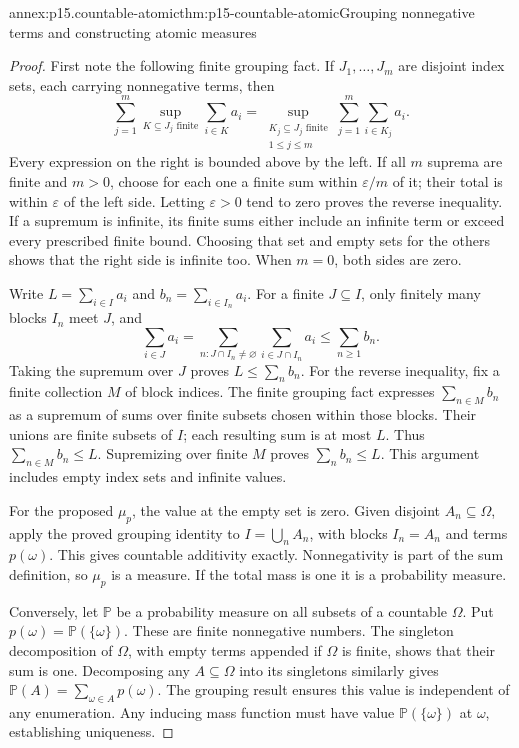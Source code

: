 \begin{annexitem}{annex:p15.countable-atomic}{thm:p15-countable-atomic}{Grouping nonnegative terms and constructing atomic measures}
\begin{proof}
First note the following finite grouping fact. If \(J_1,\ldots,J_m\)
are disjoint index sets, each carrying nonnegative terms, then
\[
 \sum_{j=1}^m\sup_{K\subseteq J_j\text{ finite}}\sum_{i\in K}a_i
 =\sup_{\substack{K_j\subseteq J_j\text{ finite}\\1\leq j\leq m}}
       \sum_{j=1}^m\sum_{i\in K_j}a_i.
\]
Every expression on the right is bounded above by the left. If all
\(m\) suprema are finite and \(m>0\), choose for each one a finite
sum within \(\varepsilon/m\) of it; their total is within
\(\varepsilon\) of the left side. Letting \(\varepsilon>0\) tend
to zero proves the reverse inequality. If a supremum is infinite, its
finite sums either include an infinite term or exceed every prescribed
finite bound. Choosing that set and empty sets for the others shows
that the right side is infinite too. When \(m=0\), both sides are zero.

Write \(L=\sum_{i\in I}a_i\) and
\(b_n=\sum_{i\in I_n}a_i\). For a finite \(J\subseteq I\),
only finitely many blocks \(I_n\) meet \(J\), and
\[
 \sum_{i\in J}a_i
   =\sum_{n:J\cap I_n\ne\varnothing}\sum_{i\in J\cap I_n}a_i
   \leq\sum_{n\geq1}b_n.
\]
Taking the supremum over \(J\) proves \(L\leq\sum_n b_n\).
For the reverse inequality, fix a finite collection \(M\) of block
indices. The finite grouping fact expresses \(\sum_{n\in M}b_n\)
as a supremum of sums over finite subsets chosen within those blocks.
Their unions are finite subsets of \(I\); each resulting sum is at
most \(L\). Thus \(\sum_{n\in M}b_n\leq L\). Supremizing over
finite \(M\) proves \(\sum_n b_n\leq L\). This argument includes
empty index sets and infinite values.

For the proposed \(\mu_p\), the value at the empty set is zero.
Given disjoint \(A_n\subseteq\Omega\), apply the proved grouping
identity to \(I=\bigcup_n A_n\), with blocks \(I_n=A_n\) and
terms \(p(\omega)\). This gives countable additivity exactly.
Nonnegativity is part of the sum definition, so \(\mu_p\) is a
measure. If the total mass is one it is a probability measure.

Conversely, let \(\mathbb P\) be a probability measure on all subsets
of a countable \(\Omega\). Put \(p(\omega)=\mathbb P(\{\omega\})\).
These are finite nonnegative numbers. The singleton decomposition of
\(\Omega\), with empty terms appended if \(\Omega\) is finite,
shows that their sum is one. Decomposing any \(A\subseteq\Omega\)
into its singletons similarly gives
\(\mathbb P(A)=\sum_{\omega\in A}p(\omega)\).
The grouping result ensures this value is independent of any enumeration.
Any inducing mass function must have value \(\mathbb P(\{\omega\})\)
at \(\omega\), establishing uniqueness.
\end{proof}
\end{annexitem}

